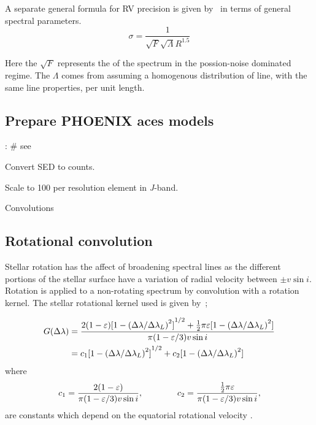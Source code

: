 A separate general formula for RV precision is given by~\citet{hatzes_spectrograph_1992} in terms of general spectral parameters.
\begin{equation}
\sigma = \frac{1}{\sqrt{F} \sqrt{\Lambda} {R}^{1.5}}
\end{equation}

Here the $\sqrt{F}$ represents the \snr{} of the spectrum in the possion-noise dominated regime.
The $\Lambda$ comes from assuming a homogenous distribution of line, with the same line properties, per unit length.



\subsection{Prepare {PHOENIX} aces models}:
\# see~\citet{figueira_radial_2016}

Convert SED to counts.


Scale to 100 \snr{} per resolution element in \emph{J}-band.

Convolutions

\subsection{Rotational convolution}
\label{subsec:rotational_convolution}
Stellar rotation has the affect of broadening spectral lines as the different portions of the stellar surface have a variation of radial velocity between \(\pm v \sin i\).
Rotation is applied to a non-rotating spectrum by convolution with a rotation kernel.
The stellar rotational kernel used is given by~\citet{gray_observation_2005};


\begin{align}
G(\Delta\lambda) &= \frac{2(1-\varepsilon){[1-{(\Delta\lambda /{\Delta\lambda}_{L})}^{2}]}^{1/2} +   \frac{1}{2}\pi\varepsilon[1-{(\Delta\lambda /{\Delta\lambda}_{L})}^{2}]}{\pi (1-\varepsilon/3) v\sin{i}}\\
      &= c_{1}{[1- {(\Delta\lambda /\Delta\lambda_{L})}^{2}]}^{1/2} + c_{2}[1-{(\Delta\lambda /\Delta\lambda_{L})}^{2}] \label{eqn:rotational_profile}
\end{align}
where
\begin{equation}
c_1 = \frac{2(1-\varepsilon)} {\pi (1-\varepsilon/3)v\sin{i}},  \hspace{4em} c_2 = \frac{\frac{1}{2}\pi\varepsilon} {\pi (1-\varepsilon/3)v\sin{i}},
\end{equation}
are constants which depend on the equatorial rotational velocity \Vsini{}.

